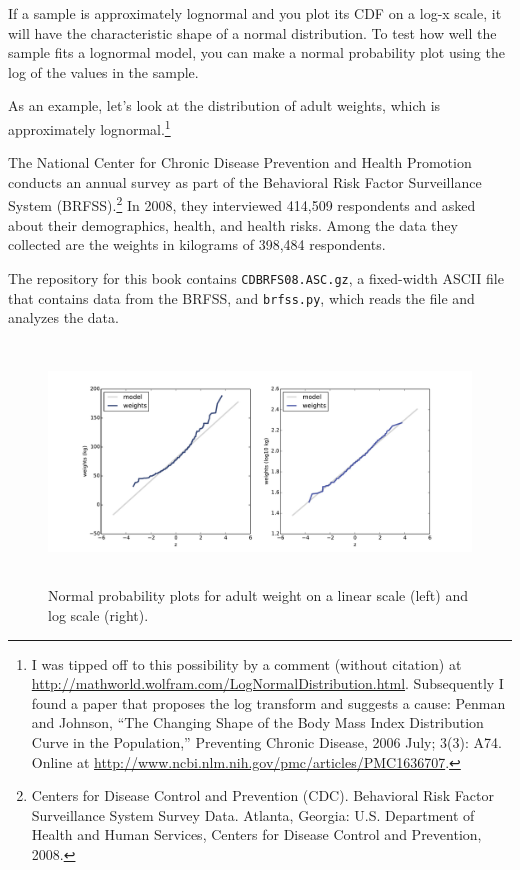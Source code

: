 \documentclass[12pt]{book}
\begin{document}
If a sample is approximately lognormal and you plot its CDF on a
log-x scale, it will have the characteristic shape of a normal
distribution.  To test how well the sample fits a lognormal model, you
can make a normal probability plot using the log of the values
in the sample.

As an example, let's look at the distribution of adult weights, which
is approximately lognormal.\footnote{I was tipped off to this
  possibility by a comment (without citation) at
  \url{http://mathworld.wolfram.com/LogNormalDistribution.html}.
  Subsequently I found a paper that proposes the log transform and
  suggests a cause: Penman and Johnson, ``The Changing Shape of the
  Body Mass Index Distribution Curve in the Population,'' Preventing
  Chronic Disease, 2006 July; 3(3): A74.  Online at
  \url{http://www.ncbi.nlm.nih.gov/pmc/articles/PMC1636707}.}

The National Center for Chronic Disease
Prevention and Health Promotion conducts an annual survey as part of
the Behavioral Risk Factor Surveillance System
(BRFSS).\footnote{Centers for Disease Control and Prevention
  (CDC). Behavioral Risk Factor Surveillance System Survey
  Data. Atlanta, Georgia: U.S. Department of Health and Human
  Services, Centers for Disease Control and Prevention, 2008.}  In
2008, they interviewed 414,509 respondents and asked about their
demographics, health, and health risks.
Among the data they collected are the weights in kilograms of
398,484 respondents.

The repository for this book contains {\tt CDBRFS08.ASC.gz},
a fixed-width ASCII file that contains data from the BRFSS,
and {\tt brfss.py}, which reads the file and analyzes the data.

\begin{figure}
\centerline{
\includegraphics[height=2.5in]{figs/brfss_weight_normal.pdf}}
\caption{Normal probability plots for adult weight on a linear scale
  (left) and log scale (right).}
\label{brfss_weight_normal}
\end{figure}
\end{document}
